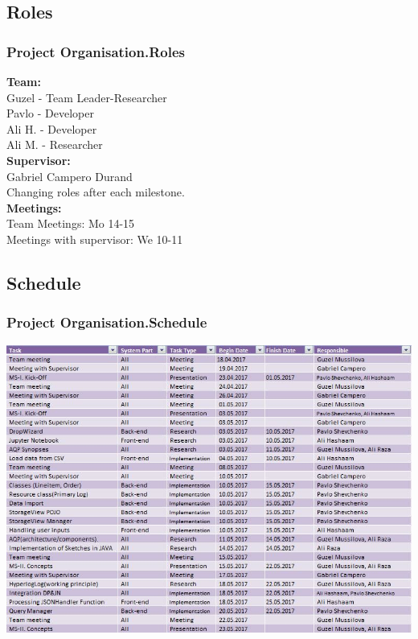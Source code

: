 \documentclass{beamer}
\begin{document}
\subsection{Roles}
\begin{frame}
\frametitle{Project Organisation.Roles}
\textbf{Team:} \\
\hspace{0.3 cm}Guzel - Team Leader-Researcher\\
\hspace{0.3 cm}Pavlo - Developer\\
\hspace{0.3 cm}Ali H. - Developer\\
\hspace{0.3 cm}Ali M. - Researcher\\
\vspace{0.2 cm}
\textbf{Supervisor:} \\
\hspace{0.3 cm} Gabriel Campero Durand \\
\vspace{0.2 cm}
Changing roles after each milestone.
\\ \vspace{0.5 cm}
\textbf{Meetings:} \\ 
\hspace{0.5 cm} Team Meetings: Mo 14-15 \\
\hspace{0.5 cm} Meetings with supervisor: We 10-11
\end{frame}

\subsection{Schedule}
\begin{frame}
\frametitle{Project Organisation.Schedule}
\includegraphics[scale=0.4]{img/Team_Schedule.jpg}
\end{frame}
\end{document}
